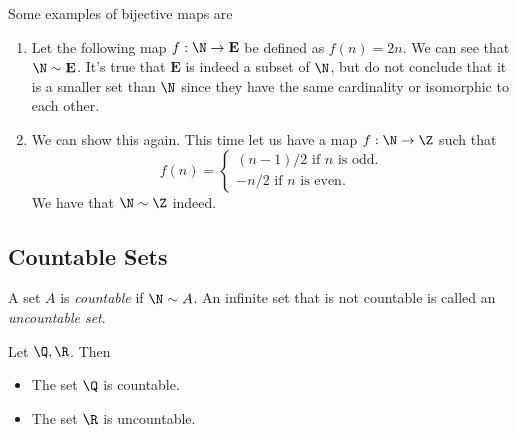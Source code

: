 \begin{ex}
Some examples of bijective maps are
\begin{enumerate}
    \item Let the following map \(f: \N \to \mathbf{E} \) be defined as \( f(n) = 2n \). We can see that \( \N \sim \mathbf{E}\). It's true that \( \mathbf{E}\) is indeed a subset of \( \N \), but do not conclude that it is a smaller set than \( \N \) since they have the same cardinality or isomorphic to each other.
    \item We can show this again. This time let us have a map \( f: \N \to \Z \) such that 
        \[ f(n) = \begin{cases}  (n-1)/2 \text{ if } n \text{ is odd.}       \\
                                 -n/2 \text{ if } n \text{ is even.}
                                                \end{cases}\]
We have that \( \N \sim \Z \) indeed.
\end{enumerate}
\end{ex}


\subsection{Countable Sets}

\begin{tcolorbox}
\begin{defn}
A set \( A \) is \textit{countable} if \( \N \sim A \). An infinite set that is not countable is called an \textit{uncountable set}.
\end{defn}
\end{tcolorbox}

\begin{tcolorbox}
\begin{thm}
Let \( \Q, \R \). Then 

\begin{itemize}
    \item The set \( \Q \) is countable. 
    \item The set \( \R \) is uncountable.
\end{itemize}


\end{thm} 
\end{tcolorbox}



